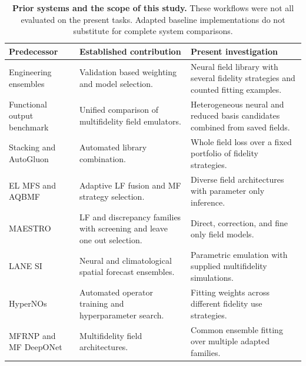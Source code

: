 \begin{table}[h!]
\centering\small\setlength{\tabcolsep}{3pt}
\caption{\textbf{Prior systems and the scope of this study.} These workflows
were not all evaluated on the present tasks. Adapted baseline implementations
do not substitute for complete system comparisons.}
\label{tab:prior}
\begin{tabular}{p{.24\linewidth}p{.31\linewidth}p{.36\linewidth}}
\toprule
Predecessor & Established contribution & Present investigation \\
\midrule
Engineering ensembles \citep{acar2009,viana2009} & Validation based weighting
and model selection. & Neural field library with several fidelity strategies
and counted fitting examples. \\
Functional output benchmark \citep{brunel2025} & Unified comparison of
multifidelity field emulators. & Heterogeneous neural and reduced basis
candidates combined from saved fields. \\
Stacking and AutoGluon \citep{wolpert1992,erickson2020} & Automated library
combination. & Whole field loss over a fixed portfolio of fidelity strategies. \\
EL MFS and AQBMF \citep{wang2024elmfs,lee2026aqbmf} & Adaptive LF fusion and
MF strategy selection. & Diverse field architectures with parameter only inference. \\
MAESTRO \citep{kim2026maestro} & LF and discrepancy families with screening
and leave one out selection. & Direct, correction, and fine only field models. \\
LANE SI \citep{borisova2024} & Neural and climatological spatial forecast
ensembles. & Parametric emulation with supplied multifidelity simulations. \\
HyperNOs \citep{ghiotto2025} & Automated operator training and hyperparameter
search. & Fitting weights across different fidelity use strategies. \\
MFRNP and MF DeepONet \citep{niu2024,howard2023} & Multifidelity field
architectures. & Common ensemble fitting over multiple adapted families. \\
\bottomrule
\end{tabular}
\end{table}

